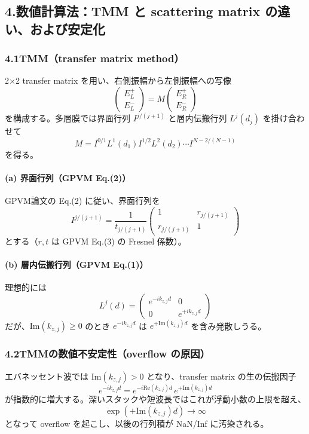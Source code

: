 \documentclass[a4paper,11pt]{jsarticle} %
\begin{document}
\subsection*{4.\;数値計算法：TMM と scattering matrix の違い、および安定化}
\subsubsection*{4.1\;TMM（transfer matrix method）}
2$\times$2 transfer matrix を用い、右側振幅から左側振幅への写像
\[
\begin{pmatrix}E_L^+\\ E_L^- \end{pmatrix}
=
M
\begin{pmatrix}E_R^+\\ E_R^- \end{pmatrix}
\]
を構成する。多層膜では界面行列 $I^{j/(j+1)}$ と層内伝搬行列 $L^j(d_j)$ を掛け合わせて
\[
M = I^{0/1} L^1(d_1) I^{1/2} L^2(d_2)\cdots I^{N-2/(N-1)}
\]
を得る。

\paragraph{(a) 界面行列（GPVM Eq.(2)）}
GPVM論文の Eq.(2) に従い、界面行列を
\[
I^{j/(j+1)}=\frac{1}{t_{j/(j+1)}}
\begin{pmatrix}
1 & r_{j/(j+1)}\\
r_{j/(j+1)} & 1
\end{pmatrix}
\]
とする（$r,t$ は GPVM Eq.(3) の Fresnel 係数）。

\paragraph{(b) 層内伝搬行列（GPVM Eq.(1)）}
理想的には
\[
L^j(d)=
\begin{pmatrix}
e^{-ik_{z,j}d} & 0\\
0 & e^{+ik_{z,j}d}
\end{pmatrix}
\]
だが、$\mathrm{Im}(k_{z,j})\ge 0$ のとき $e^{-ik_{z,j}d}$ は $e^{+\mathrm{Im}(k_{z,j})d}$ を含み発散しうる。

\subsubsection*{4.2\;TMMの数値不安定性（overflow の原因）}
エバネッセント波では $\mathrm{Im}(k_{z,j})>0$ となり、transfer matrix の生の伝搬因子
\[
e^{-ik_{z,j}d}=e^{-i\mathrm{Re}(k_{z,j})d}\,e^{+\mathrm{Im}(k_{z,j})d}
\]
が指数的に増大する。深いスタックや短波長ではこれが浮動小数の上限を超え、
\[
\exp(+\mathrm{Im}(k_{z,j})d)\rightarrow \infty
\]
となって overflow を起こし、以後の行列積が NaN/Inf に汚染される。
\end{document}

